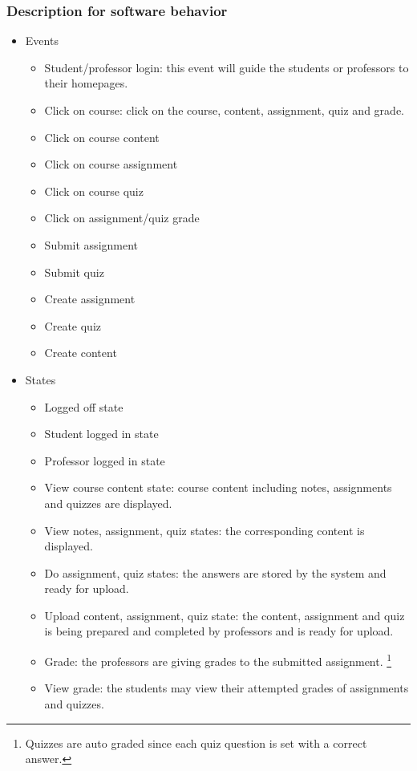 \documentclass[paper=a4, fontsize=11pt]{scrartcl}
\numberwithin{equation}{section}		%
\numberwithin{figure}{section}			%
\numberwithin{table}{section}				%
\begin{document}
\subsubsection{Description for software behavior}

\begin{itemize}
	\item Events
	\begin{itemize}
		\item Student/professor login: this event will guide the students or professors to their homepages.
		\item Click on course: click on the course, content, assignment, quiz and grade.
		\item Click on course content
		\item Click on course assignment
		\item Click on course quiz
		\item Click on assignment/quiz grade
		\item Submit assignment
		\item Submit quiz
		\item Create assignment
		\item Create quiz
		\item Create content
	\end{itemize}
	\item States
	\begin{itemize}
		\item Logged off state
		\item Student logged in state
		\item Professor logged in state
		\item View course content state: course content including notes, assignments and quizzes are displayed.
		\item View notes, assignment, quiz states: the corresponding content is displayed.
		\item Do assignment, quiz states: the answers are stored by the system and ready for upload.
		\item Upload content, assignment, quiz state: the content, assignment and quiz is being prepared and completed by professors and is ready for upload.
		\item Grade: the professors are giving grades to the submitted assignment. \footnote{Quizzes are auto graded since each quiz question is set with a correct answer.}
		\item View grade: the students may view their attempted grades of assignments and quizzes.
	\end{itemize}
\end{itemize}
\end{document}
